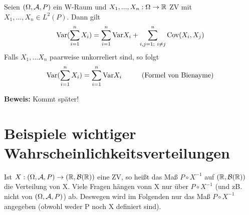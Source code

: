 \documentclass[parskip = full, 12pt]{scrartcl}
\begin{document}
\label{ss: Satz 4.14}
	Seien $(\Omega, \mathcal{A}, P)$ ein W-Raum und $X_1, ..., X_n:\Omega \rightarrow \mathbb{R}$ ZV
	mit $X_1, ..., X_n \in L^2(P)$. Dann gilt 
	$$\textrm{Var} (\sum_{i = 1}^n X_i) = \sum_{i=1}^n \textrm{Var} X_i + \sum_{i,j=1;\ i \neq j}
	^n \textrm{Cov}(X_i, X_j)$$
	Falls $X_1, ... X_n$ paarweise unkorreliert sind, so folgt 
	$$\textrm{Var}( \sum_{i=1}^n X_i) = \sum_{i=1}^n \textrm{Var} X_i \hspace{1 cm}
	\textrm{(Formel von Bienayme)}$$

	\textbf{Beweis:} Kommt später!

\section{Beispiele wichtiger Wahrscheinlichkeitsverteilungen}
	Ist $X: (\Omega, \mathcal{A}, P) \rightarrow (\mathbb{R}, \mathcal{B}(\mathbb{R}))$ eine ZV, so heißt das 
	Maß $P \circ X^{-1}$ auf $(\mathbb{R}, \mathcal{B}(\mathbb{R}))$ die Verteilung von X. Viele 
	Fragen hängen vonn X nur über $P \circ X^{-1}$ (und zB. nicht von $(\Omega, \mathcal{A}, 
	P)$) ab. Deswegen wird im Folgenden nur das Maß $P \circ X^{-1}$ angegeben 
	(obwohl weder P noch X definiert sind). 
\end{document}
